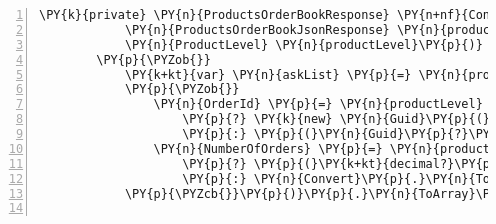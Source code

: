 \begin{Verbatim}[commandchars=\\\{\},numbers=left,firstnumber=1,stepnumber=1,numberblanklines=0]
        \PY{k}{private} \PY{n}{ProductsOrderBookResponse} \PY{n+nf}{ConvertProductOrderBookResponse}\PY{p}{(}
            \PY{n}{ProductsOrderBookJsonResponse} \PY{n}{productsOrderBookJsonResponse}\PY{p}{,}
            \PY{n}{ProductLevel} \PY{n}{productLevel}\PY{p}{)}
        \PY{p}{\PYZob{}}
            \PY{k+kt}{var} \PY{n}{askList} \PY{p}{=} \PY{n}{productsOrderBookJsonResponse}\PY{p}{.}\PY{n}{Asks}\PY{p}{.}\PY{n}{Select}\PY{p}{(}\PY{n}{product} \PY{p}{=}\PY{p}{\PYZgt{}} \PY{n}{product}\PY{p}{.}\PY{n}{ToArray}\PY{p}{(}\PY{p}{)}\PY{p}{)}\PY{p}{.}\PY{n}{Select}\PY{p}{(}\PY{n}{askArray} \PY{p}{=}\PY{p}{\PYZgt{}} \PY{k}{new} \PY{n}{Ask}\PY{p}{(}\PY{n}{Convert}\PY{p}{.}\PY{n}{ToDecimal}\PY{p}{(}\PY{n}{askArray}\PY{p}{[}\PY{l+m}{0}\PY{p}{]}\PY{p}{,} \PY{n}{CultureInfo}\PY{p}{.}\PY{n}{InvariantCulture}\PY{p}{)}\PY{p}{,} \PY{n}{Convert}\PY{p}{.}\PY{n}{ToDecimal}\PY{p}{(}\PY{n}{askArray}\PY{p}{[}\PY{l+m}{1}\PY{p}{]}\PY{p}{,} \PY{n}{CultureInfo}\PY{p}{.}\PY{n}{InvariantCulture}\PY{p}{)}\PY{p}{)}
            \PY{p}{\PYZob{}}
                \PY{n}{OrderId} \PY{p}{=} \PY{n}{productLevel} \PY{p}{=}\PY{p}{=} \PY{n}{ProductLevel}\PY{p}{.}\PY{n}{Three}
                    \PY{p}{?} \PY{k}{new} \PY{n}{Guid}\PY{p}{(}\PY{n}{askArray}\PY{p}{[}\PY{l+m}{2}\PY{p}{]}\PY{p}{)}
                    \PY{p}{:} \PY{p}{(}\PY{n}{Guid}\PY{p}{?}\PY{p}{)}\PY{k}{null}\PY{p}{,}
                \PY{n}{NumberOfOrders} \PY{p}{=} \PY{n}{productLevel} \PY{p}{=}\PY{p}{=} \PY{n}{ProductLevel}\PY{p}{.}\PY{n}{Three}
                    \PY{p}{?} \PY{p}{(}\PY{k+kt}{decimal?}\PY{p}{)}\PY{k}{null}
                    \PY{p}{:} \PY{n}{Convert}\PY{p}{.}\PY{n}{ToDecimal}\PY{p}{(}\PY{n}{askArray}\PY{p}{[}\PY{l+m}{2}\PY{p}{]}\PY{p}{,} \PY{n}{CultureInfo}\PY{p}{.}\PY{n}{InvariantCulture}\PY{p}{)}
            \PY{p}{\PYZcb{}}\PY{p}{)}\PY{p}{.}\PY{n}{ToArray}\PY{p}{(}\PY{p}{)}\PY{p}{;}


\end{Verbatim}
